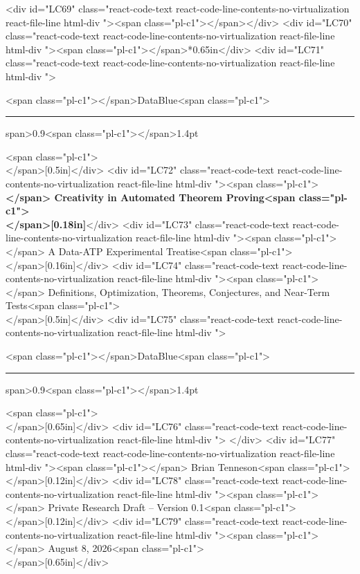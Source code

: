 {{{{{{{<div id="LC69" class="react-code-text react-code-line-contents-no-virtualization react-file-line html-div "><span class="pl-c1">\centering</span></div>
<div id="LC70" class="react-code-text react-code-line-contents-no-virtualization react-file-line html-div "><span class="pl-c1">\vspace</span>*{0.65in}</div>
<div id="LC71" class="react-code-text react-code-line-contents-no-virtualization react-file-line html-div ">{<span class="pl-c1">\color</span>{DataBlue}<span class="pl-c1">\rule</span>{0.9<span class="pl-c1">\textwidth</span>}{1.4pt}}<span class="pl-c1">\\</span>[0.5in]</div>
<div id="LC72" class="react-code-text react-code-line-contents-no-virtualization react-file-line html-div ">{<span class="pl-c1">\Huge\bfseries</span> Creativity in Automated Theorem Proving<span class="pl-c1">\\</span>[0.18in]}</div>
<div id="LC73" class="react-code-text react-code-line-contents-no-virtualization react-file-line html-div ">{<span class="pl-c1">\Large</span> A Data-ATP Experimental Treatise<span class="pl-c1">\\</span>[0.16in]}</div>
<div id="LC74" class="react-code-text react-code-line-contents-no-virtualization react-file-line html-div ">{<span class="pl-c1">\large</span> Definitions, Optimization, Theorems, Conjectures, and Near-Term Tests<span class="pl-c1">\\</span>[0.5in]}</div>
<div id="LC75" class="react-code-text react-code-line-contents-no-virtualization react-file-line html-div ">{<span class="pl-c1">\color</span>{DataBlue}<span class="pl-c1">\rule</span>{0.9<span class="pl-c1">\textwidth</span>}{1.4pt}}<span class="pl-c1">\\</span>[0.65in]</div>
<div id="LC76" class="react-code-text react-code-line-contents-no-virtualization react-file-line html-div ">
</div>
<div id="LC77" class="react-code-text react-code-line-contents-no-virtualization react-file-line html-div ">{<span class="pl-c1">\Large</span> Brian Tenneson}<span class="pl-c1">\\</span>[0.12in]</div>
<div id="LC78" class="react-code-text react-code-line-contents-no-virtualization react-file-line html-div ">{<span class="pl-c1">\large</span> Private Research Draft -- Version 0.1}<span class="pl-c1">\\</span>[0.12in]</div>
<div id="LC79" class="react-code-text react-code-line-contents-no-virtualization react-file-line html-div ">{<span class="pl-c1">\large</span> August 8, 2026}<span class="pl-c1">\\</span>[0.65in]</div>
}}}}}}}
